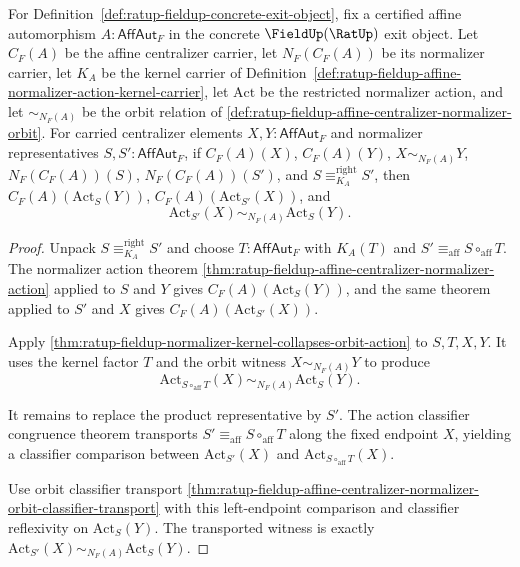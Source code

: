 \begin{theorem}
\label{thm:ratup-fieldup-normalizer-kernel-representatives-act-equally-on-orbits}
For Definition~\ref{def:ratup-fieldup-concrete-exit-object}, fix a certified
affine automorphism $A:\mathsf{AffAut}_F$ in the concrete $\FieldUp(\RatUp)$
exit object. Let $C_F(A)$ be the affine centralizer carrier, let
$N_F(C_F(A))$ be its normalizer carrier, let $K_A$ be the kernel carrier of
Definition~\ref{def:ratup-fieldup-affine-normalizer-action-kernel-carrier}, let
$\mathrm{Act}$ be the restricted normalizer action, and let
$\sim_{N_F(A)}$ be the orbit relation of
\autoref{def:ratup-fieldup-affine-centralizer-normalizer-orbit}. For carried
centralizer elements $X,Y:\mathsf{AffAut}_F$ and normalizer representatives
$S,S':\mathsf{AffAut}_F$, if $C_F(A)(X)$, $C_F(A)(Y)$,
$X\sim_{N_F(A)}Y$, $N_F(C_F(A))(S)$, $N_F(C_F(A))(S')$, and
$S\equiv_{K_A}^{\mathrm{right}}S'$, then
$C_F(A)(\mathrm{Act}_S(Y))$, $C_F(A)(\mathrm{Act}_{S'}(X))$, and
$$
\mathrm{Act}_{S'}(X)\sim_{N_F(A)}\mathrm{Act}_S(Y).
$$
\end{theorem}
\begin{proof}
Unpack $S\equiv_{K_A}^{\mathrm{right}}S'$ and choose
$T:\mathsf{AffAut}_F$ with $K_A(T)$ and
$S'\equiv_{\mathrm{aff}}S\circ_{\mathrm{aff}}T$. The normalizer action theorem
\autoref{thm:ratup-fieldup-affine-centralizer-normalizer-action} applied to
$S$ and $Y$ gives $C_F(A)(\mathrm{Act}_S(Y))$, and the same theorem applied to
$S'$ and $X$ gives $C_F(A)(\mathrm{Act}_{S'}(X))$.

Apply
\autoref{thm:ratup-fieldup-normalizer-kernel-collapses-orbit-action}
to $S,T,X,Y$. It uses the kernel factor $T$ and the orbit witness
$X\sim_{N_F(A)}Y$ to produce
$$
\mathrm{Act}_{S\circ_{\mathrm{aff}}T}(X)\sim_{N_F(A)}\mathrm{Act}_S(Y).
$$

It remains to replace the product representative by $S'$. The action
classifier congruence theorem transports
$S'\equiv_{\mathrm{aff}}S\circ_{\mathrm{aff}}T$ along the fixed endpoint $X$,
yielding a classifier comparison between $\mathrm{Act}_{S'}(X)$ and
$\mathrm{Act}_{S\circ_{\mathrm{aff}}T}(X)$.

Use orbit classifier transport
\autoref{thm:ratup-fieldup-affine-centralizer-normalizer-orbit-classifier-transport}
with this left-endpoint comparison and classifier reflexivity on
$\mathrm{Act}_S(Y)$. The transported witness is exactly
$\mathrm{Act}_{S'}(X)\sim_{N_F(A)}\mathrm{Act}_S(Y)$.
\end{proof}

